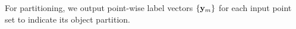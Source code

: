 %
%
For partitioning, we output point-wise label vectors $\{\mathbf{y}_m\}$ for each input point set to indicate its object partition. %
%
